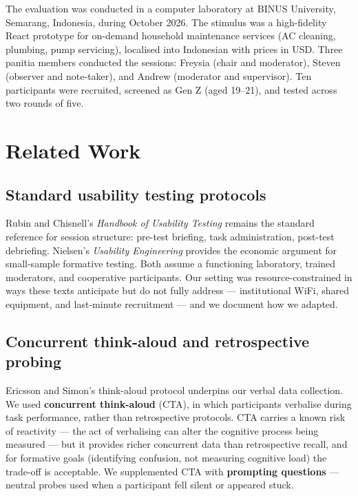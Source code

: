 \documentclass[conference]{IEEEtran}
\begin{document}
The evaluation was conducted in a computer laboratory at BINUS University, Semarang, Indonesia,
during October 2026. The stimulus was a high-fidelity React prototype for on-demand household
maintenance services (AC cleaning, plumbing, pump servicing), localised into Indonesian with prices
in USD. Three panitia members conducted the sessions: Freysia (chair and moderator), Steven (observer
and note-taker), and Andrew (moderator and supervisor). Ten participants were recruited, screened as
Gen Z (aged 19--21), and tested across two rounds of five.

\section{Related Work}

\subsection{Standard usability testing protocols}

Rubin and Chisnell's \emph{Handbook of Usability Testing} \cite{rubin} remains the standard reference
for session structure: pre-test briefing, task administration, post-test debriefing. Nielsen's
\emph{Usability Engineering} \cite{nielsen} provides the economic argument for small-sample formative
testing. Both assume a functioning laboratory, trained moderators, and cooperative participants. Our
setting was resource-constrained in ways these texts anticipate but do not fully address ---
institutional WiFi, shared equipment, and last-minute recruitment --- and we document how we adapted.

\subsection{Concurrent think-aloud and retrospective probing}

Ericsson and Simon's think-aloud protocol \cite{ericsson} underpins our verbal data collection. We
used \textbf{concurrent think-aloud} (CTA), in which participants verbalise during task performance,
rather than retrospective protocols. CTA carries a known risk of reactivity --- the act of
verbalising can alter the cognitive process being measured --- but it provides richer concurrent data
than retrospective recall, and for formative goals (identifying confusion, not measuring cognitive
load) the trade-off is acceptable. We supplemented CTA with \textbf{prompting questions} --- neutral
probes used when a participant fell silent or appeared stuck.
\end{document}
